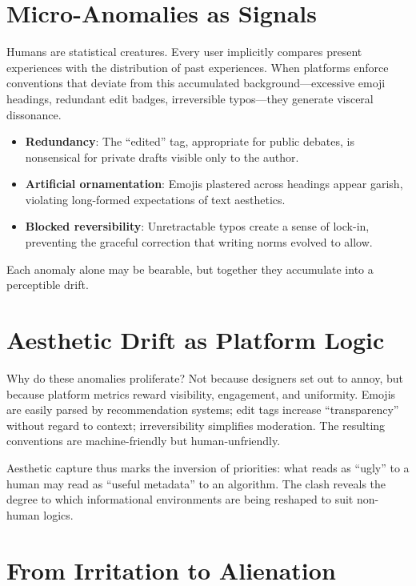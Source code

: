 \documentclass[openany]{book}
\begin{document}
\section{Micro-Anomalies as Signals}

Humans are statistical creatures. Every user implicitly compares present experiences with the distribution of past experiences. When platforms enforce conventions that deviate from this accumulated background---excessive emoji headings, redundant edit badges, irreversible typos---they generate visceral dissonance.

\begin{itemize}
    \item \textbf{Redundancy}: The ``edited'' tag, appropriate for public debates, is nonsensical for private drafts visible only to the author.
    \item \textbf{Artificial ornamentation}: Emojis plastered across headings appear garish, violating long-formed expectations of text aesthetics.
    \item \textbf{Blocked reversibility}: Unretractable typos create a sense of lock-in, preventing the graceful correction that writing norms evolved to allow.
\end{itemize}

Each anomaly alone may be bearable, but together they accumulate into a perceptible drift.

\section{Aesthetic Drift as Platform Logic}

Why do these anomalies proliferate? Not because designers set out to annoy, but because platform metrics reward visibility, engagement, and uniformity. Emojis are easily parsed by recommendation systems; edit tags increase ``transparency'' without regard to context; irreversibility simplifies moderation. The resulting conventions are machine-friendly but human-unfriendly.

Aesthetic capture thus marks the inversion of priorities: what reads as ``ugly'' to a human may read as ``useful metadata'' to an algorithm. The clash reveals the degree to which informational environments are being reshaped to suit non-human logics.

\section{From Irritation to Alienation}
\end{document}
